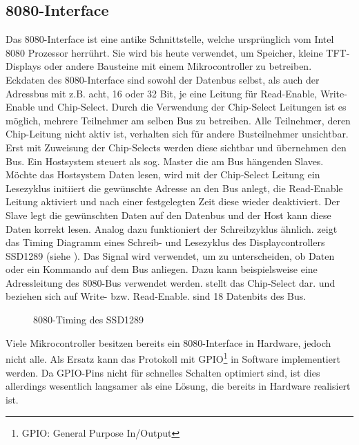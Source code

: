 \subsection{8080-Interface}
Das 8080-Interface ist eine antike Schnittstelle, welche ursprünglich vom Intel 8080 Prozessor herrührt. Sie wird bis heute verwendet, um Speicher, kleine TFT-Displays oder andere Bausteine mit einem Mikrocontroller zu betreiben. Eckdaten des 8080-Interface sind sowohl der Datenbus selbst, als auch der Adressbus mit z.B. acht, 16 oder 32 Bit, je eine Leitung für Read-Enable, Write-Enable und Chip-Select. Durch die Verwendung der Chip-Select Leitungen ist es möglich, mehrere Teilnehmer am selben Bus zu betreiben. Alle Teilnehmer, deren Chip-Leitung nicht aktiv ist, verhalten sich für andere Busteilnehmer unsichtbar. Erst mit Zuweisung der Chip-Selects werden diese sichtbar und übernehmen den Bus. Ein Hostsystem steuert als sog. Master die am Bus hängenden Slaves. Möchte das Hostsystem Daten lesen, wird mit der Chip-Select Leitung ein Lesezyklus initiiert die gewünschte Adresse an den Bus anlegt, die Read-Enable Leitung aktiviert und nach einer festgelegten Zeit diese wieder deaktiviert. Der Slave legt die gewünschten Daten auf den Datenbus und der Host kann diese Daten korrekt lesen. Analog dazu funktioniert der Schreibzyklus ähnlich. 
 zeigt das Timing Diagramm eines Schreib- und Lesezyklus des Displaycontrollers SSD1289 (siehe \cite{SSD2007}). Das Signal  wird verwendet, um zu unterscheiden, ob Daten oder ein Kommando auf dem Bus anliegen. Dazu kann beispielsweise eine Adressleitung des 8080-Bus verwendet werden.  stellt das Chip-Select dar.  und  beziehen sich auf Write- bzw. Read-Enable.  sind 18 Datenbits des Bus. 

\begin{figure}[htp]
	\centering
{}
	\caption{8080-Timing des SSD1289}
	\label{fig:8080_timing}
\end{figure}
Viele Mikrocontroller besitzen bereits ein 8080-Interface in Hardware, jedoch nicht alle. Als Ersatz kann das Protokoll mit GPIO\footnote{GPIO: General Purpose In/Output} in Software implementiert werden. 
Da GPIO-Pins nicht für schnelles Schalten optimiert sind, ist dies allerdings wesentlich langsamer als eine Lösung, die bereits in Hardware realisiert ist.
\clearpage


